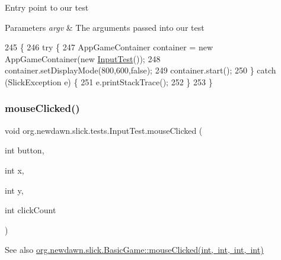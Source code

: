 Entry point to our test


\begin{DoxyParams}{Parameters}
{\em argv} & The arguments passed into our test \\
\hline
\end{DoxyParams}

\begin{DoxyCode}
245                                            \{
246         \textcolor{keywordflow}{try} \{
247             AppGameContainer container = \textcolor{keyword}{new} AppGameContainer(\textcolor{keyword}{new} \mbox{\hyperlink{classorg_1_1newdawn_1_1slick_1_1tests_1_1_input_test_a73386ef79c61414f910685a079722d32}{InputTest}}());
248             container.setDisplayMode(800,600,\textcolor{keyword}{false});
249             container.start();
250         \} \textcolor{keywordflow}{catch} (SlickException e) \{
251             e.printStackTrace();
252         \}
253     \}
\end{DoxyCode}
\mbox{\label{classorg_1_1newdawn_1_1slick_1_1tests_1_1_input_test_a69ff71dd569d86c9b5b187d8329078be}} 
\subsubsection{\texorpdfstring{mouse\+Clicked()}{mouseClicked()}}
{\footnotesize\ttfamily void org.\+newdawn.\+slick.\+tests.\+Input\+Test.\+mouse\+Clicked (\begin{DoxyParamCaption}\item[{int}]{button,  }\item[{int}]{x,  }\item[{int}]{y,  }\item[{int}]{click\+Count }\end{DoxyParamCaption})\hspace{0.3cm}{\ttfamily [inline]}}

\begin{DoxySeeAlso}{See also}
\mbox{\hyperlink{classorg_1_1newdawn_1_1slick_1_1_basic_game_a3103343304121288da2e40cc49466f94}{org.\+newdawn.\+slick.\+Basic\+Game\+::mouse\+Clicked(int, int, int, int)}} 
\end{DoxySeeAlso}


